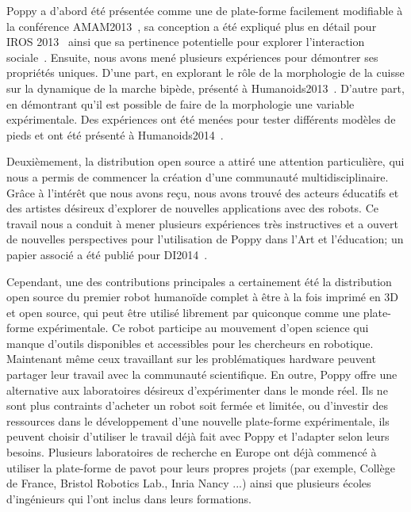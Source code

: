 Poppy a d'abord été présentée comme une de plate-forme facilement modifiable à la conférence AMAM2013~\parencite{lapeyre:hal-00788433}, sa conception a été expliqué plus en détail pour IROS 2013~\parencite{lapeyre:hal-00852858} ainsi que sa pertinence potentielle pour explorer l'interaction sociale~\parencite{lapeyre:hal-00984312}. Ensuite, nous avons mené plusieurs expériences pour démontrer ses propriétés uniques. D'une part, en explorant le rôle de la morphologie de la cuisse sur la dynamique de la marche bipède, présenté à Humanoids2013~\parencite{lapeyre:hal-00861110}. D'autre part, en démontrant qu'il est possible de faire de la morphologie une variable expérimentale. Des expériences ont été menées pour tester différents modèles de pieds et ont été présenté à Humanoids2014~\parencite{lapeyre2014humanoids}.

Deuxièmement, la distribution open source a attiré une attention particulière, qui nous a permis de commencer la création d'une communauté multidisciplinaire. Grâce à l'intérêt que nous avons reçu, nous avons trouvé des acteurs éducatifs et des artistes désireux d'explorer de nouvelles applications avec des robots. Ce travail nous a conduit à mener plusieurs expériences très instructives et a ouvert de nouvelles perspectives pour l'utilisation de Poppy dans l'Art et l'éducation; un papier associé a été publié pour DI2014~\parencite{lapeyreDI}.

Cependant, une des contributions principales a certainement été la distribution open source du premier robot humanoïde complet à être à la fois imprimé en 3D et open source, qui peut être utilisé librement par quiconque comme une plate-forme expérimentale. 
Ce robot participe au mouvement d'open science qui manque d'outils disponibles et accessibles pour les chercheurs en robotique.  Maintenant même ceux travaillant sur les problématiques hardware peuvent partager leur travail avec la communauté scientifique. En outre, Poppy offre une alternative aux laboratoires désireux d'expérimenter dans le monde réel. Ils ne sont plus contraints d'acheter un robot soit fermée et limitée, ou d'investir des ressources dans le développement d'une nouvelle plate-forme expérimentale, ils peuvent choisir d'utiliser le travail déjà fait avec Poppy et l'adapter selon leurs besoins.
Plusieurs laboratoires de recherche en Europe ont déjà commencé à utiliser la plate-forme de pavot pour leurs propres projets (par exemple, Collège de France, Bristol Robotics Lab., Inria Nancy ...) ainsi que plusieurs écoles d'ingénieurs qui l'ont inclus dans leurs formations.

